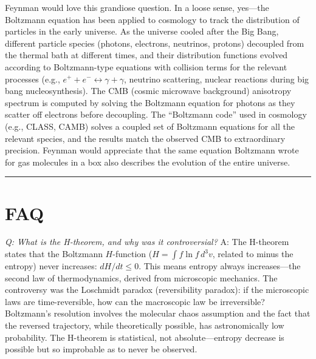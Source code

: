 Feynman would love this grandiose question. In a loose sense, yes---the Boltzmann equation has been applied to cosmology to track the distribution of particles in the early universe. As the universe cooled after the Big Bang, different particle species (photons, electrons, neutrinos, protons) decoupled from the thermal bath at different times, and their distribution functions evolved according to Boltzmann-type equations with collision terms for the relevant processes (e.g., $e^+ + e^- \leftrightarrow \gamma + \gamma$, neutrino scattering, nuclear reactions during big bang nucleosynthesis). The CMB (cosmic microwave background) anisotropy spectrum is computed by solving the Boltzmann equation for photons as they scatter off electrons before decoupling. The ``Boltzmann code'' used in cosmology (e.g., CLASS, CAMB) solves a coupled set of Boltzmann equations for all the relevant species, and the results match the observed CMB to extraordinary precision. Feynman would appreciate that the same equation Boltzmann wrote for gas molecules in a box also describes the evolution of the entire universe.

\bigskip
\hrule
\bigskip



\section*{FAQ}

\textit{Q: What is the H-theorem, and why was it controversial?}
A: The H-theorem states that the Boltzmann $H$-function ($H = \int f\ln f\,d^3v$, related to minus the entropy) never increases: $dH/dt \leq 0$. This means entropy always increases---the second law of thermodynamics, derived from microscopic mechanics. The controversy was the Loschmidt paradox (reversibility paradox): if the microscopic laws are time-reversible, how can the macroscopic law be irreversible? Boltzmann's resolution involves the molecular chaos assumption and the fact that the reversed trajectory, while theoretically possible, has astronomically low probability. The H-theorem is statistical, not absolute---entropy decrease is possible but so improbable as to never be observed.

